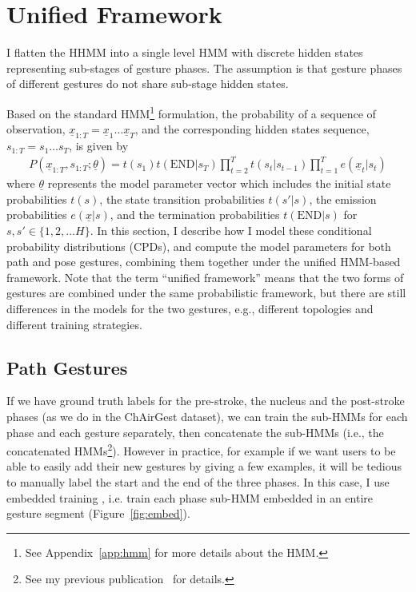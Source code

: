 \section{Unified Framework}
I flatten the HHMM into a single level HMM with discrete hidden states 
representing sub-stages of gesture phases. The assumption is that
gesture phases of different gestures do not share sub-stage hidden states.

Based on the standard HMM\footnote{See Appendix~\ref{app:hmm} for more details
about the HMM.} formulation, the probability of a sequence of observation,
$\underline{x}_{1:T} = \underline{x}_1\ldots\underline{x}_T$, and the corresponding hidden states sequence, $s_{1:T} = s_1\ldots s_T$, is given by
\begin{align}
P(\underline{x}_{1:T}, s_{1:T};\underline{\theta}) = 
    t(s_1)t(\text{END}|s_T)\prod_{t = 2}^T t(s_t | s_{t-1})\prod_{t = 1}^T
    e(\underline{x}_t|s_t)\label{eq:hmm}
\end{align}
where $\underline{\theta}$ represents the model parameter vector which includes
the initial state probabilities $t(s)$, the state transition probabilities $t(s'|s)$, the 
emission probabilities $e(\underline{x}|s)$,
and the termination probabilities $t(\text{END}|s)$ for $s, s'\in \{1, 2,\ldots
H\}$. In this section, I describe how I model these conditional
probability distributions (CPDs), and compute the model parameters for both
path and pose gestures, combining them together under the unified HMM-based
framework. Note that the term ``unified framework'' means that the two forms of
gestures are combined under the same probabilistic framework, but there are
still differences in the models for the two gestures, e.g., different topologies
and different training strategies.

\subsection{Path Gestures}
If we have ground truth labels for the pre-stroke, the nucleus and the
post-stroke phases (as we do in the ChAirGest dataset), we can train the
sub-HMMs for each phase and each gesture separately, then concatenate the
sub-HMMs (i.e., the concatenated HMMs\footnote{See my previous
publication~\cite{yin13} for details.}).
However in practice, for example if we want users to be able to easily add their new gestures by giving a few
examples, it will be tedious to manually label the start and the end of the
three phases. In this case, I use embedded training \cite{young1994}, i.e.
train each phase sub-HMM embedded in an entire gesture segment
(Figure~\ref{fig:embed}).

